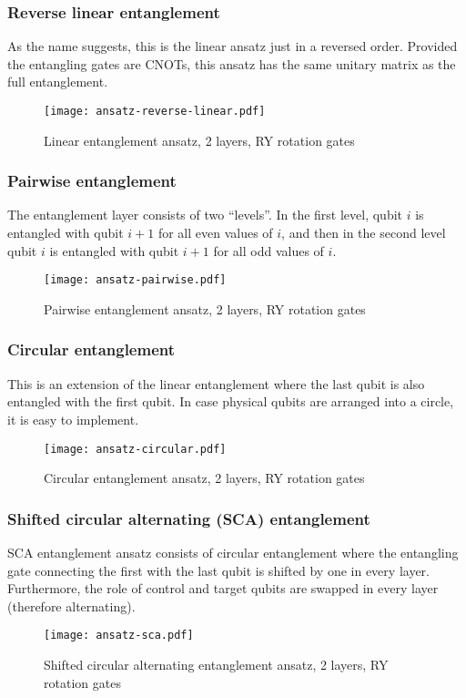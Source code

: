 \subsubsection{Reverse linear entanglement}
As the name suggests, this is the linear ansatz just in a reversed order. Provided the entangling gates are CNOTs, this ansatz has the same unitary matrix as the full entanglement. 
\begin{figure}[H]
    \centering
    \texttt{[image: ansatz-reverse-linear.pdf]}
    \caption{Linear entanglement ansatz, 2 layers, RY rotation gates}
\end{figure}

\subsubsection{Pairwise entanglement}
The entanglement layer consists of two ``levels''. In the first level, qubit $i$ is entangled with qubit $i+1$ for all even values of $i$, and then in the second level qubit $i$ is entangled with qubit $i+1$ for all odd values of $i$. 
\begin{figure}[H]
    \centering
    \texttt{[image: ansatz-pairwise.pdf]}
    \caption{Pairwise entanglement ansatz, 2 layers, RY rotation gates}
\end{figure}

\subsubsection{Circular entanglement}
This is an extension of the linear entanglement where the last qubit is also entangled with the first qubit. In case physical qubits are arranged into a circle, it is easy to implement.
\begin{figure}[H]
    \centering
    \texttt{[image: ansatz-circular.pdf]}
    \caption{Circular entanglement ansatz, 2 layers, RY rotation gates}
\end{figure}

\subsubsection{Shifted circular alternating (SCA) entanglement}
SCA entanglement ansatz consists of circular entanglement where the entangling gate connecting the first with the last qubit is shifted by one in every layer. Furthermore, the role of control and target qubits are swapped in every layer (therefore alternating).
\begin{figure}[H]
    \centering
    \texttt{[image: ansatz-sca.pdf]}
    \caption{Shifted circular alternating entanglement ansatz, 2 layers, RY rotation gates}
\end{figure}
